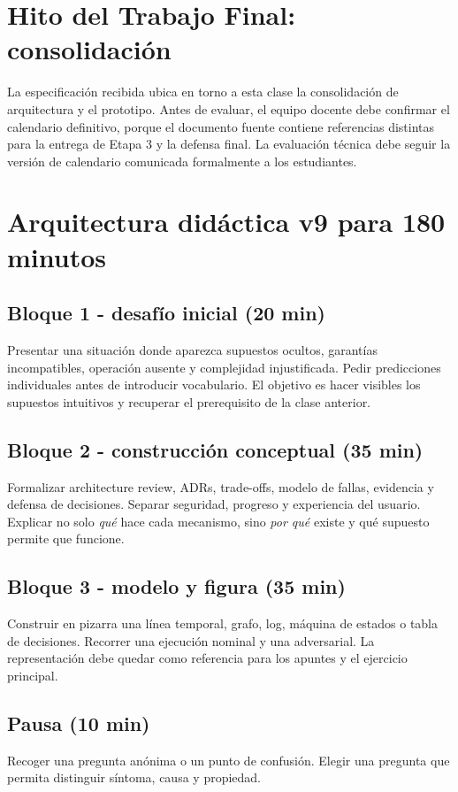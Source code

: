 \documentclass[variant=docente,cover=institutional,mode=screen]{ua-engineering-v6-article}
\begin{document}
\section{Hito del Trabajo Final: consolidación}
La especificación recibida ubica en torno a esta clase la consolidación de arquitectura y el prototipo. Antes de evaluar, el equipo docente debe confirmar el calendario definitivo, porque el documento fuente contiene referencias distintas para la entrega de Etapa 3 y la defensa final. La evaluación técnica debe seguir la versión de calendario comunicada formalmente a los estudiantes.

\section{Arquitectura didáctica v9 para 180 minutos}
\subsection*{Bloque 1 - desafío inicial (20 min)}
Presentar una situación donde aparezca supuestos ocultos, garantías incompatibles, operación ausente y complejidad injustificada. Pedir predicciones individuales antes de introducir vocabulario. El objetivo es hacer visibles los supuestos intuitivos y recuperar el prerequisito de la clase anterior.

\subsection*{Bloque 2 - construcción conceptual (35 min)}
Formalizar architecture review, ADRs, trade-offs, modelo de fallas, evidencia y defensa de decisiones. Separar seguridad, progreso y experiencia del usuario. Explicar no solo \emph{qué} hace cada mecanismo, sino \emph{por qué} existe y qué supuesto permite que funcione.

\subsection*{Bloque 3 - modelo y figura (35 min)}
Construir en pizarra una línea temporal, grafo, log, máquina de estados o tabla de decisiones. Recorrer una ejecución nominal y una adversarial. La representación debe quedar como referencia para los apuntes y el ejercicio principal.

\subsection*{Pausa (10 min)}
Recoger una pregunta anónima o un punto de confusión. Elegir una pregunta que permita distinguir síntoma, causa y propiedad.
\end{document}
